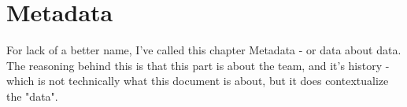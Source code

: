 \part{Metadata}
	\label{part:metadata}
    \label{metadata}
    For lack of a better name, I've called this chapter Metadata - or data about data. The reasoning behind this is that this part is about the team, and it's  history - which is not technically what this document is about, but it does contextualize the "data".\\

    
            
    
    
    